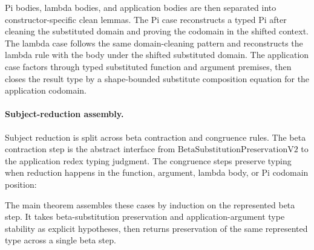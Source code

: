 Pi bodies, lambda bodies, and application bodies are then separated into
constructor-specific clean lemmas. The Pi case reconstructs a typed Pi after
cleaning the substituted domain and proving the codomain in the shifted
context.
The lambda case follows the same domain-cleaning pattern and reconstructs the
lambda rule with the body under the shifted substituted domain.
The application case factors through typed substituted function and argument
premises, then closes the result type by a shape-bounded substitute composition
equation for the application codomain.

\paragraph{Subject-reduction assembly.}
Subject reduction is split across beta contraction and congruence rules. The
beta contraction step is the abstract interface from
$\mathrm{BetaSubstitutionPreservationV2}$ to the application redex typing
judgment. The congruence steps preserve typing when reduction happens in the
function, argument, lambda body, or Pi codomain position:

The main theorem assembles these cases by induction on the represented beta
step. It takes beta-substitution preservation and application-argument type
stability as explicit hypotheses, then returns preservation of the same
represented type across a single beta step.
